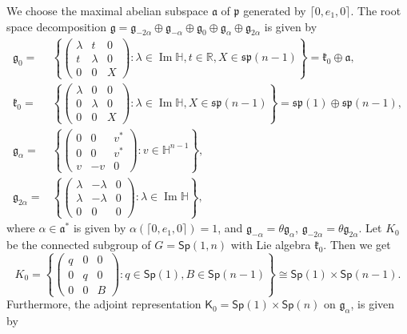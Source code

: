 \documentclass[12pt, a4paper]{amsart}
\newcommand{\g}{\mathfrak}
\newcommand{\R}{\mathbb{R}}
\renewcommand{\H}{\mathbb{H}}
\renewcommand{\Im}{\operatorname{Im}}
\newcommand{\Sp}{\mathsf{Sp}}
\theoremstyle{remark}
\begin{document}
We choose the maximal abelian subspace $\g{a}$ of $\g{p}$ generated by $\lceil 0,e_{1},0\rceil$.
The root space decomposition $\g{g}=\g{g}_{-2\alpha}\oplus\g{g}_{-\alpha}\oplus\g{g}_{0}\oplus\g{g}_{\alpha}\oplus\g{g}_{2\alpha}$ is given by
\[
\begin{aligned}
\g{g}_{0}={}&\left\{
	\left(
		\begin{array}{cc|c}
			\lambda & t & 0 \\
			t & \lambda & 0 \\
			\hline
			0 & 0 & X
		\end{array}
	\right)\colon \lambda\in\Im\H,t\in\R,X\in\g{sp}(n-1)
\right\}=\g{k}_{0}\oplus \g{a}, \\
\g{k}_{0}={}&\left\{
\left(
\begin{array}{cc|c}
	\lambda & 0 & 0 \\
	0 & \lambda & 0 \\
	\hline
	0 & 0 & X
\end{array}
\right)\colon \lambda\in\Im\H,X\in\g{sp}(n-1)
\right\}=\g{sp}(1)\oplus \g{sp}(n-1), \\
\g{g}_{\alpha}={}&\left\{
	\left(
		\begin{array}{cc|c}
			0 & 0 & v^{*} \\
			0 & 0 & v^{*} \\
			\hline
			v & -v & 0
		\end{array}
	\right)\colon v\in \H^{n-1}
\right\}, \\
\g{g}_{2\alpha}={}&\left\{
	\left(
		\begin{array}{cc|c}
			\lambda & -\lambda & 0 \\
			\lambda & -\lambda & 0 \\
			\hline
			0 & 0 & 0
		\end{array}
	\right)\colon \lambda\in \Im \H
\right\},
\end{aligned}
\]
where $\alpha\in\g{a}^*$ is given by $\alpha(\lceil 0,e_1,0\rceil)=1$, 
and $\g{g}_{-\alpha}=\theta\g{g}_\alpha$, $\g{g}_{-2\alpha}=\theta\g{g}_{2\alpha}$.
Let ${K}_{0}$ be the connected subgroup of ${G}=\Sp(1,n)$ with Lie algebra $\g{k}_{0}$.
Then we get
\[
{K}_{0}=\left\{
	\left(
		\begin{array}{cc|c}
			q & 0 & 0 \\
			0 & q & 0 \\
			\hline
			0 & 0 & B
		\end{array}
	\right)\colon q\in\mathsf{Sp}(1),B\in\mathsf{Sp}(n-1)
\right\}
\cong\mathsf{Sp}(1)\times\mathsf{Sp}(n-1).
\]
Furthermore, the adjoint representation $\mathsf{K}_{0}=\Sp(1)\times\Sp(n)$ on $\g{g}_{\alpha}$, is given by
\end{document}
